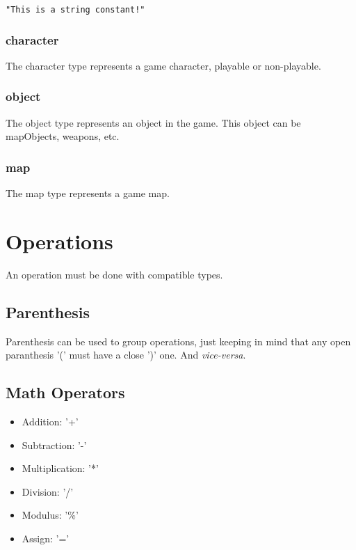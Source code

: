 \documentclass[ letterpaper,12pt]{article}
\begin{document}
\begin{verbatim}
"This is a string constant!"
\end{verbatim}

\subsubsection{character}

The character type represents a game character, playable or non-playable.

\subsubsection{object}

The object type represents an object in the game. This object can be mapObjects,
weapons, etc.

\subsubsection{map}

The map type represents a game map.

\section{Operations}

An operation must be done with compatible types.

\subsection{Parenthesis}

Parenthesis can be used to group operations, just keeping in mind that any open
paranthesis '(' must have a close ')' one. And {\it vice-versa}.

\subsection{Math Operators}

\begin{itemize}
\item{Addition: '+'}
\item{Subtraction: '-'}
\item{Multiplication: '*'}
\item{Division: '/'}
\item{Modulus: '\%'}
\item{Assign: '='}
\end{itemize}
\end{document}
